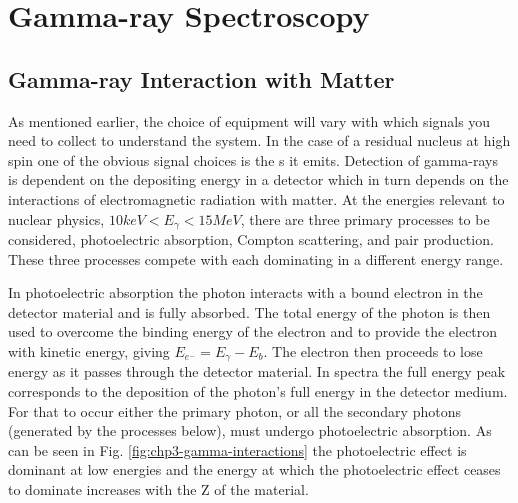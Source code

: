\section{Gamma-ray Spectroscopy}
\label{sec:exp-pr-gamma-spec}
\subsection{Gamma-ray Interaction with Matter}
\label{ssec:exp-pr-gamma-spec-interactions}
As mentioned earlier, the choice of equipment will vary with which signals you need to collect to understand the system. In the case of a residual nucleus at high spin one of the obvious signal choices is the \gr{}s it emits. Detection of gamma-rays is dependent on the \gr{} depositing energy in a detector which in turn depends on the interactions of electromagnetic radiation with matter. At the energies relevant to nuclear physics, $10keV<E_{\gamma}<15MeV$, there are three primary processes to be considered, photoelectric absorption, Compton scattering, and pair production. These three processes compete with each dominating in a different energy range.

In photoelectric absorption the photon interacts with a bound electron in the detector material and is fully absorbed\cite{einstein-PE}. The total energy of the photon is then used to overcome the binding energy of the electron and to provide the electron with kinetic energy, giving $E_{e^-}=E_{\gamma}-E_b$. The electron then proceeds to lose energy as it passes through the detector material. In \gr{} spectra the full energy peak corresponds to the deposition of the photon's full energy in the detector medium. For that to occur either the primary photon, or all the secondary photons (generated by the processes below), must undergo photoelectric absorption. As can be seen in Fig. \ref{fig:chp3-gamma-interactions} the photoelectric effect is dominant at low energies and the energy at which the photoelectric effect ceases to dominate increases with the Z of the material.

